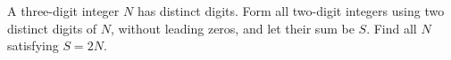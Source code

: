 A three-digit integer $N$ has distinct digits. Form all two-digit integers using two distinct digits of $N$, without leading zeros, and let their sum be $S$. Find all $N$ satisfying $S=2N$.

